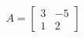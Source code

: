 \documentclass[preview]{standalone}
\begin{document}
\begin{align*}
A = \begin{bmatrix} 3 & -5 \\ 1 & 2 \end{bmatrix}
\end{align*}
\end{document}
